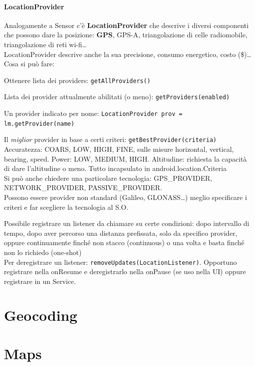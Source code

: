 \documentclass[10pt]{book}
\begin{document}
\paragraph{LocationProvider} Analogamente a Sensor c'è \textbf{LocationProvider} che descrive i diversi componenti che possono dare la posizione: \textbf{GPS}, GPS-A, triangolazione di celle radiomobile, triangolazione di reti wi-fi\ldots\\
LocationProvider descrive anche la sua precisione, consumo energetico, costo (\$)\ldots\\
Cosa si può fare:
\begin{list}{}{}
	\item Ottenere lista dei providers: \texttt{getAllProviders()}
	\item Lista dei provider attualmente abilitati (o meno): \texttt{getProviders(enabled)}
	\item Un provider indicato per nome: \texttt{LocationProvider prov = lm.getProvider(name)}
	\item Il \textit{miglior} provider in base a certi criteri: \texttt{getBestProvider(criteria)}\\
	Accuratezza: COARS, LOW, HIGH, FINE, sulle misure horizontal, vertical, bearing, speed. Power: LOW, MEDIUM, HIGH. Altitudine: richiesta la capacità di dare l'altitudine o meno. Tutto incapsulato in android.location.Criteria\\
	Si può anche chiedere una particolare tecnologia: GPS\_PROVIDER, NETWORK\_PROVIDER, PASSIVE\_PROVIDER.\\
	Possono essere provider non standard (Galileo, GLONASS\ldots) meglio specificare i criteri e far scegliere la tecnologia al S.O.
\end{list}
Possibile registrare un listener da chiamare su certe condizioni: dopo intervallo di tempo, dopo aver percorso una distanza prefissata, solo da specifico provider, oppure continuamente finché non stacco (continuous) o una volta e basta finché non lo richiedo (one-shot)\\
Per deregistrare un listener: \texttt{removeUpdates(LocationListener)}. Opportuno registrare nella onResume e deregistrarlo nella onPause (se uso nella UI) oppure registrare in un Service.
\section{Geocoding}
\section{Maps}
\end{document}
